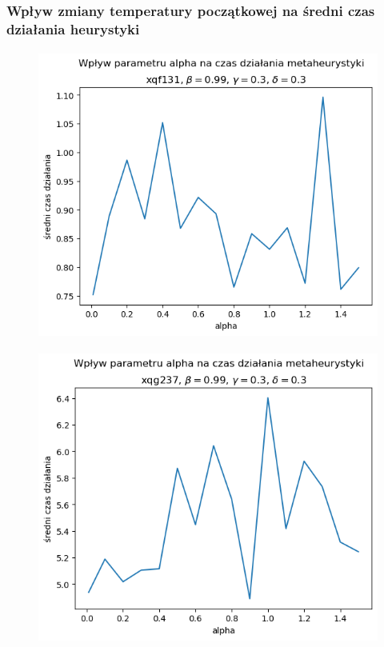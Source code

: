 \documentclass{article}
\begin{document}
\subsubsection{Wpływ zmiany temperatury początkowej na średni czas działania heurystyki}
    \begin{figure}[h!]
        \centering
        \includegraphics[height=9.5cm]{../../plots/sa-tuning-alpha-time-xqf131.png}
    \end{figure}

    \begin{figure}[h!]
        \centering
        \includegraphics[height=9.5cm]{../../plots/sa-tuning-alpha-time-xqg237.png}
    \end{figure}


\newpage 
\end{document}
